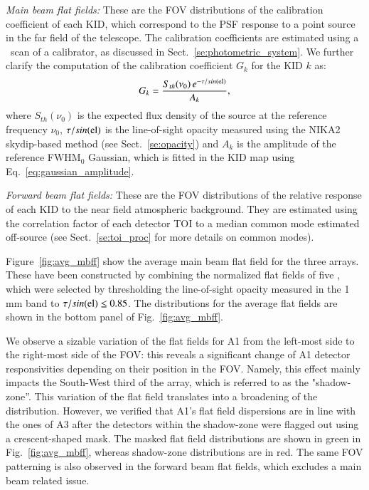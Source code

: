 \noindent \emph{Main beam flat fields:} These are the FOV distributions
of the calibration coefficient of each KID, which correspond to the
PSF response to a point source in the far field of the
telescope. The calibration coefficients are estimated using a \bm\ scan
of a calibrator, as discussed in Sect.~\ref{se:photometric_system}. We
further clarify the computation of the calibration coefficient $G_k$
for the KID $k$ as:
\begin{equation}
  G_k = \frac{S_{th}(\nu_0)\, e^{-\tau/sin(\rm{el})}}{A_k}, 
\end{equation}
where $S_{th}(\nu_0)$ is the expected flux density of the source at
the reference frequency $\nu_0$, $\tau/sin(\rm{el})$ is the
line-of-sight opacity measured using the NIKA2 skydip-based method
(see Sect.~\ref{se:opacity}) and $A_k$ is the
amplitude of the reference FWHM$_0$ Gaussian, which is fitted in the
KID map using Eq.~\ref{eq:gaussian_amplitude}.

\noindent \emph{Forward beam flat fields:} These are the FOV
distributions of the relative response of
each KID to the near field atmospheric background. They are estimated
using the correlation factor of each detector TOI 
to a median common mode estimated off-source (see Sect.~\ref{se:toi_proc} for
more details on common modes).

Figure~\ref{fig:avg_mbff} %
show the average main beam %
flat field for the three arrays. These have been constructed by
combining the normalized flat fields of five \bms, which were
selected by thresholding the line-of-sight opacity measured in the
1\,mm band to $\tau/sin(\rm{el}) \leq 0.85$. The distributions for the average flat
fields are shown in the bottom panel of Fig.~\ref{fig:avg_mbff}.%

We observe a sizable variation of the flat fields for A1 from the left-most side
to the right-most side of the FOV: this reveals a significant change of A1
detector responsivities depending on their position in the FOV. Namely, this
effect mainly impacts the South-West third of the array, which is
referred to as the "shadow-zone''. This variation of the
flat field translates into a broadening of the distribution. However, we verified that A1's
flat field dispersions are in line with the ones of A3 after the
detectors within the shadow-zone were flagged out using a
crescent-shaped mask. The masked flat field distributions are shown in
green in Fig.~\ref{fig:avg_mbff}, %
whereas shadow-zone distributions are in red. The same FOV patterning
is also observed in the forward beam flat fields, which excludes a
main beam related issue. 

